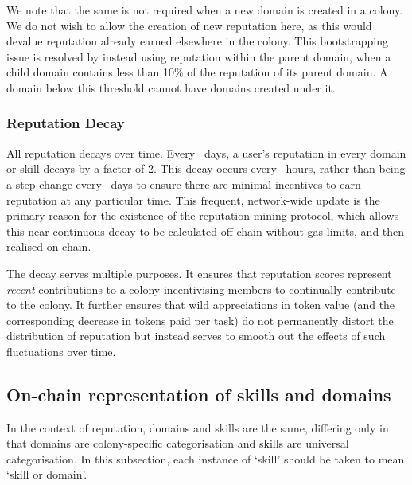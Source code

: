 We note that the same is not required when a new domain is created in a colony. We do not wish to allow the creation of new reputation here, as this would devalue reputation already earned elsewhere in the colony. This bootstrapping issue is resolved by instead using reputation within the parent domain, when a child domain contains less than 10\% of the reputation of its parent domain. A domain below this threshold cannot have domains created under it.

\subsubsection{Reputation Decay}
All reputation decays over time. Every \repdecayduration\ days, a user's reputation in every domain or skill decays by a factor of 2. This decay occurs every \miningcycleduration\ hours, rather than being a step change every \repdecayduration\ days to ensure there are minimal incentives to earn reputation at any particular time. This frequent, network-wide update is the primary reason for the existence of the reputation mining protocol, which allows this near-continuous decay to be calculated off-chain without gas limits, and then realised on-chain.

The decay serves multiple purposes. It ensures that reputation scores represent \emph{recent} contributions to a colony incentivising members to continually contribute to the colony. It further ensures that wild appreciations in token value (and the corresponding decrease in tokens paid per task) do not permanently distort the distribution of reputation but instead serves to smooth out the effects of such fluctuations over time.

\subsection{On-chain representation of skills and domains}\label{subsec:on-chain-representation-of-skills}
In the context of reputation, domains and skills are the same, differing only in that domains are colony-specific categorisation and skills are universal categorisation. In this subsection, each instance of `skill' should be taken to mean `skill or domain'.

